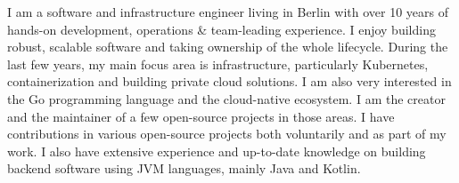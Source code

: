 
\begin{cvparagraph}

    I am a software and infrastructure engineer living in Berlin
    with over 10 years of hands-on development, operations \& team-leading experience.
    \newline
    I enjoy building robust, scalable software and taking ownership of the whole lifecycle.
    \newline
    During the last few years, my main focus area is infrastructure, particularly Kubernetes,
    containerization and building private cloud solutions.
    I am also very interested in the Go programming language and the cloud-native ecosystem.
    I am the creator and the maintainer of a few open-source projects in those areas.
    \newline
    I have contributions in various open-source projects both voluntarily and as part of my work.
    \newline
    I also have extensive experience and up-to-date knowledge on building backend software
    using JVM languages, mainly Java and Kotlin.

\end{cvparagraph}
